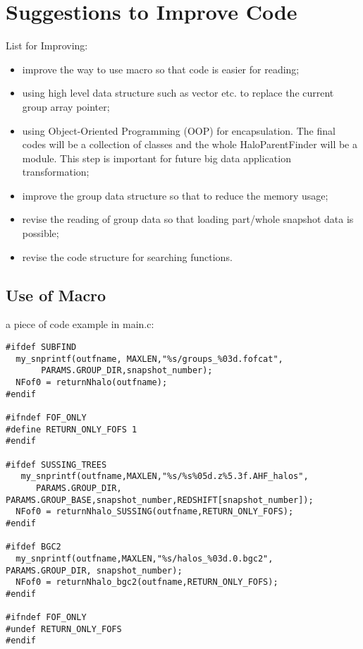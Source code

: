 \documentclass[notheorems, aspectratio=54]{beamer}
\begin{document}
\section{Suggestions to Improve Code}
\begin{frame}

\begin{block}{List for Improving:}
 \begin{itemize}
  \item improve the way to use macro so that code is easier for reading;
  \item using high level data structure such as vector etc. to replace the current 
  group array pointer;
  \item using Object-Oriented Programming (OOP) for encapsulation. The final codes 
  will be a collection of classes and the whole HaloParentFinder will be a module. This 
  step is important for future big data application transformation;
  \item improve the group data structure so that to reduce the memory usage;
  \item revise the reading of group data so that loading part/whole snapshot data is 
  possible;
  \item revise the code structure for searching functions.
 \end{itemize}
\end{block}
 
\end{frame}

\subsection{Use of Macro}
\begin{frame}[fragile]

a piece of code example in main.c:
 \begin{verbatim}
#ifdef SUBFIND
  my_snprintf(outfname, MAXLEN,"%s/groups_%03d.fofcat", 
       PARAMS.GROUP_DIR,snapshot_number);    
  NFof0 = returnNhalo(outfname);
#endif

#ifndef FOF_ONLY
#define RETURN_ONLY_FOFS 1  
#endif
   
#ifdef SUSSING_TREES
   my_snprintf(outfname,MAXLEN,"%s/%s%05d.z%5.3f.AHF_halos", 
      PARAMS.GROUP_DIR, PARAMS.GROUP_BASE,snapshot_number,REDSHIFT[snapshot_number]);
  NFof0 = returnNhalo_SUSSING(outfname,RETURN_ONLY_FOFS);
#endif

#ifdef BGC2
  my_snprintf(outfname,MAXLEN,"%s/halos_%03d.0.bgc2",  PARAMS.GROUP_DIR, snapshot_number);
  NFof0 = returnNhalo_bgc2(outfname,RETURN_ONLY_FOFS);
#endif  

#ifndef FOF_ONLY  
#undef RETURN_ONLY_FOFS
#endif
 \end{verbatim}
 
\end{frame}
\end{document}
